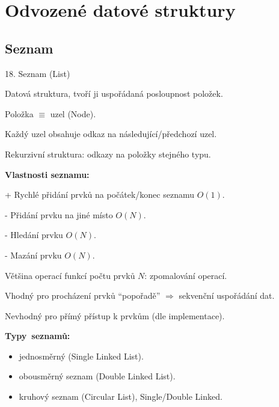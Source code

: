 \documentclass[czech]{beamer}
\begin{document}
\section{Odvozené datové struktury}

\subsection{Seznam}
\begin{frame}{18. Seznam (List)}

{\scriptsize Datová struktura, tvoří ji uspořádaná posloupnost položek.}{\scriptsize\par}

{\scriptsize Položka $\equiv$ uzel (Node).}{\scriptsize\par}

{\scriptsize Každý uzel obsahuje odkaz na následující/předchozí uzel.}{\scriptsize\par}

{\scriptsize Rekurzivní struktura: odkazy na položky stejného typu.\bigskip{}
}{\scriptsize\par}

{\scriptsize\textbf{Vlastnosti seznamu:}}{\scriptsize\par}

{\scriptsize + Rychlé přidání prvků na počátek/konec seznamu $O(1)$.}{\scriptsize\par}

{\scriptsize - Přidání prvku na jiné místo $O(N).$}{\scriptsize\par}

{\scriptsize - Hledání prvku $O(N).$}{\scriptsize\par}

{\scriptsize - Mazání prvku $O(N).$\medskip{}
}{\scriptsize\par}

{\scriptsize Většina operací funkcí počtu prvků $N$: zpomalování operací.}{\scriptsize\par}

{\scriptsize Vhodný pro procházení prvků ``popořadě'' $\Rightarrow$
sekvenční uspořádání dat.}{\scriptsize\par}

{\scriptsize Nevhodný pro přímý přístup k prvkům (dle implementace).\bigskip{}
}{\scriptsize\par}

{\scriptsize\textbf{Typy~seznamů:}}{\scriptsize\par}
\begin{itemize}
\item {\scriptsize jednosměrný (Single Linked List).}{\scriptsize\par}
\item {\scriptsize obousměrný seznam (Double Linked List).}{\scriptsize\par}
\item {\scriptsize kruhový seznam (Circular List), Single/Double Linked.}{\scriptsize\par}
\end{itemize}
\end{frame}
\end{document}
